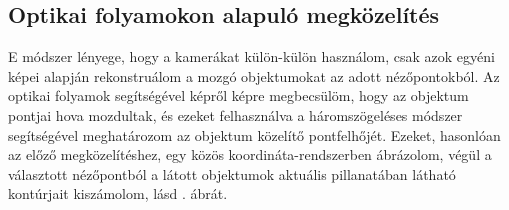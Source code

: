 \subsection{Optikai folyamokon alapuló megközelítés}

E módszer lényege, hogy a kamerákat külön-külön használom, csak azok egyéni képei alapján rekonstruálom a mozgó objektumokat az adott nézőpontokból. Az optikai folyamok segítségével képről képre megbecsülöm, hogy az objektum pontjai hova mozdultak, és ezeket felhasználva a háromszögeléses módszer segítségével meghatározom az objektum közelítő pontfelhőjét. Ezeket, hasonlóan az előző megközelítéshez, egy közös koordináta-rendszerben ábrázolom, végül a választott nézőpontból a látott objektumok aktuális pillanatában látható kontúrjait kiszámolom, lásd . ábrát.

